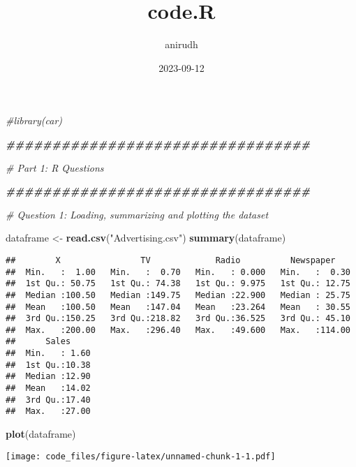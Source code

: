 \documentclass[
]{article}
\title{code.R}
\author{anirudh}
\date{2023-09-12}
\newenvironment{Shaded}{\begin{snugshade}}{\end{snugshade}}
\newcommand{\CommentTok}[1]{\textcolor[rgb]{0.56,0.35,0.01}{\textit{#1}}}
\newcommand{\DocumentationTok}[1]{\textcolor[rgb]{0.56,0.35,0.01}{\textbf{\textit{#1}}}}
\newcommand{\FunctionTok}[1]{\textcolor[rgb]{0.13,0.29,0.53}{\textbf{#1}}}
\newcommand{\NormalTok}[1]{#1}
\newcommand{\OtherTok}[1]{\textcolor[rgb]{0.56,0.35,0.01}{#1}}
\newcommand{\StringTok}[1]{\textcolor[rgb]{0.31,0.60,0.02}{#1}}
\begin{document}
\maketitle

\begin{Shaded}
\begin{Highlighting}[]
\CommentTok{\#library(car)}

\DocumentationTok{\#\#\#\#\#\#\#\#\#\#\#\#\#\#\#\#\#\#\#\#\#\#\#\#\#\#\#\#\#\#\#\#\#}

\CommentTok{\# Part 1: R Questions}

\DocumentationTok{\#\#\#\#\#\#\#\#\#\#\#\#\#\#\#\#\#\#\#\#\#\#\#\#\#\#\#\#\#\#\#\#\#}

\CommentTok{\# Question 1: Loading, summarizing and plotting the dataset}

\NormalTok{dataframe }\OtherTok{\textless{}{-}} \FunctionTok{read.csv}\NormalTok{(}\StringTok{"Advertising.csv"}\NormalTok{)}
\FunctionTok{summary}\NormalTok{(dataframe)}
\end{Highlighting}
\end{Shaded}

\begin{verbatim}
##        X                TV             Radio          Newspaper     
##  Min.   :  1.00   Min.   :  0.70   Min.   : 0.000   Min.   :  0.30  
##  1st Qu.: 50.75   1st Qu.: 74.38   1st Qu.: 9.975   1st Qu.: 12.75  
##  Median :100.50   Median :149.75   Median :22.900   Median : 25.75  
##  Mean   :100.50   Mean   :147.04   Mean   :23.264   Mean   : 30.55  
##  3rd Qu.:150.25   3rd Qu.:218.82   3rd Qu.:36.525   3rd Qu.: 45.10  
##  Max.   :200.00   Max.   :296.40   Max.   :49.600   Max.   :114.00  
##      Sales      
##  Min.   : 1.60  
##  1st Qu.:10.38  
##  Median :12.90  
##  Mean   :14.02  
##  3rd Qu.:17.40  
##  Max.   :27.00
\end{verbatim}

\begin{Shaded}
\begin{Highlighting}[]
\FunctionTok{plot}\NormalTok{(dataframe)}
\end{Highlighting}
\end{Shaded}

\texttt{[image: code\_files/figure-latex/unnamed-chunk-1-1.pdf]}
\end{document}
